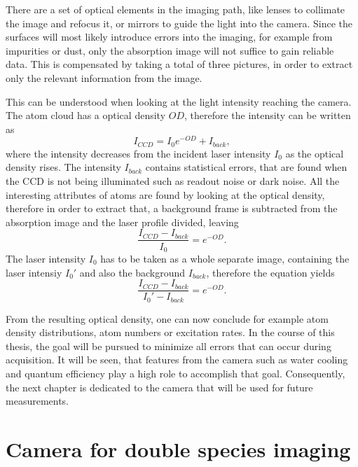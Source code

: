 
There are a set of optical elements in the imaging path, like lenses to collimate the image and refocus it, or mirrors to guide the light into the camera. Since the surfaces will most likely introduce errors into the imaging, for example from impurities or dust, only the absorption image will not suffice to gain reliable data. This is compensated by taking a total of three pictures, in order to extract only the relevant information from the image.

This can be understood when looking at the light intensity reaching the camera. The atom cloud has a optical density $OD$, therefore the intensity can be written as
\begin{equation}
I_{CCD} = I_0 e^{-OD} + I_{back},
\end{equation}
where the intensity decreases from the incident laser intensity $I_0$ as the optical density rises. The intensity $I_{back}$ contains statistical errors, that are found when the CCD is not being illuminated such as readout noise or dark noise. All the interesting attributes of atoms are found by looking at the optical density, therefore in order to extract that, a background frame is subtracted from the absorption image and the laser profile divided, leaving
\begin{equation}
\frac{I_{CCD} - I_{back}}{I_0} = e^{-OD}.
\end{equation}
The laser intensity $I_0$ has to be taken as a whole separate image, containing the laser intensiy $I_0'$ and also the background $I_{back}$, therefore the equation yields
\begin{equation}
\frac{I_{CCD} - I_{back}}{I_0' - I_{back}} = e^{-OD}.
\end{equation}

From the resulting optical density, one can now conclude for example atom density distributions, atom numbers or excitation rates.
In the course of this thesis, the goal will be pursued to minimize all errors that can occur during acquisition. It will be seen, that features from the camera such as water cooling and quantum efficiency play a high role to accomplish that goal. Consequently, the next chapter is dedicated to the camera that will be used for future measurements.

\section{Camera for double species imaging}
\label{ch:camera}

